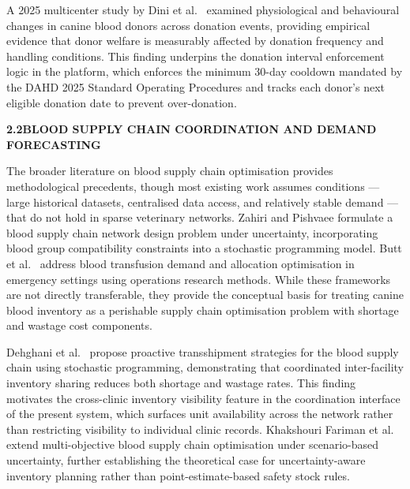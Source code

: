 \documentclass[12pt,a4paper]{article}
\begin{document}
\noindent A 2025 multicenter study by Dini et al.\ \cite{dini2025} examined physiological and behavioural changes in canine blood donors across donation events, providing empirical evidence that donor welfare is measurably affected by donation frequency and handling conditions. This finding underpins the donation interval enforcement logic in the platform, which enforces the minimum 30-day cooldown mandated by the DAHD 2025 Standard Operating Procedures \cite{dahd2025, pib2025} and tracks each donor's next eligible donation date to prevent over-donation.

\vspace{1.5em}
\noindent\textbf{2.2\quad BLOOD SUPPLY CHAIN COORDINATION AND DEMAND FORECASTING}
\vspace{0.6em}

\noindent The broader literature on blood supply chain optimisation provides methodological precedents, though most existing work assumes conditions — large historical datasets, centralised data access, and relatively stable demand — that do not hold in sparse veterinary networks. Zahiri and Pishvaee \cite{zahiri2018} formulate a blood supply chain network design problem under uncertainty, incorporating blood group compatibility constraints into a stochastic programming model. Butt et al.\ \cite{butt2018} address blood transfusion demand and allocation optimisation in emergency settings using operations research methods. While these frameworks are not directly transferable, they provide the conceptual basis for treating canine blood inventory as a perishable supply chain optimisation problem with shortage and wastage cost components.

\noindent Dehghani et al.\ \cite{dehghani2021} propose proactive transshipment strategies for the blood supply chain using stochastic programming, demonstrating that coordinated inter-facility inventory sharing reduces both shortage and wastage rates. This finding motivates the cross-clinic inventory visibility feature in the coordination interface of the present system, which surfaces unit availability across the network rather than restricting visibility to individual clinic records. Khakshouri Fariman et al.\ \cite{khakshouri2024} extend multi-objective blood supply chain optimisation under scenario-based uncertainty, further establishing the theoretical case for uncertainty-aware inventory planning rather than point-estimate-based safety stock rules.
\end{document}
